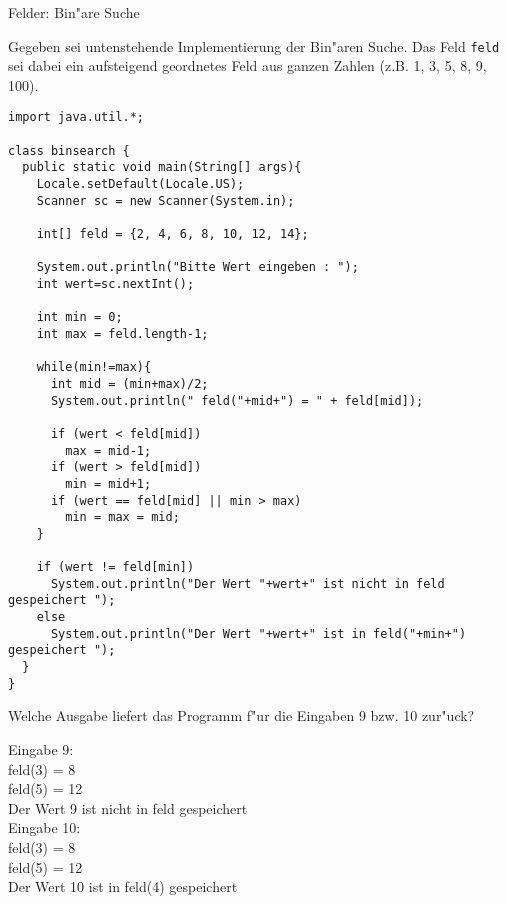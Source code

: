 \begin{exercise}{Felder: Bin"are Suche}
\begin{body}
Gegeben sei untenstehende Implementierung der Bin"aren Suche. Das Feld \verb|feld| sei dabei ein aufsteigend geordnetes Feld aus ganzen Zahlen (z.B. 1, 3, 5, 8, 9, 100).
\begin{verbatim}
import java.util.*;

class binsearch {
  public static void main(String[] args){
    Locale.setDefault(Locale.US);
    Scanner sc = new Scanner(System.in);
    
    int[] feld = {2, 4, 6, 8, 10, 12, 14};
    
    System.out.println("Bitte Wert eingeben : ");
    int wert=sc.nextInt();
    
    int min = 0;
    int max = feld.length-1;
    
    while(min!=max){
      int mid = (min+max)/2;
      System.out.println(" feld("+mid+") = " + feld[mid]);
    
      if (wert < feld[mid])
        max = mid-1;
      if (wert > feld[mid])
        min = mid+1;
      if (wert == feld[mid] || min > max)
        min = max = mid;
    }
    
    if (wert != feld[min])
      System.out.println("Der Wert "+wert+" ist nicht in feld gespeichert ");
    else
      System.out.println("Der Wert "+wert+" ist in feld("+min+") gespeichert ");
  }
}
\end{verbatim}
Welche Ausgabe liefert das Programm f"ur die Eingaben 9 bzw. 10 zur"uck?
\end{body}

\begin{solution}

Eingabe 9:\\
 feld(3) = 8\\
 feld(5) = 12\\
Der Wert 9 ist nicht in feld gespeichert\\

Eingabe 10:\\
 feld(3) = 8\\
 feld(5) = 12\\
Der Wert 10 ist in feld(4) gespeichert
\end{solution}

\end{exercise}
